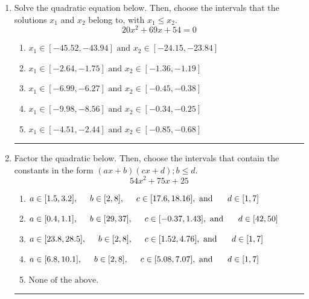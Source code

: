 \documentclass[14pt]{extbook}
\newcommand{\litem}[1]{\item#1\hspace*{-1cm}\rule{\textwidth}{0.4pt}}
\begin{document}
\begin{enumerate}
\litem{
Solve the quadratic equation below. Then, choose the intervals that the solutions $x_1$ and $x_2$ belong to, with $x_1 \leq x_2$.\[ 20x^{2} +69 x + 54 = 0 \]\begin{enumerate}[label=\Alph*.]
\item \( x_1 \in [-45.52, -43.94] \text{ and } x_2 \in [-24.15, -23.84] \)
\item \( x_1 \in [-2.64, -1.75] \text{ and } x_2 \in [-1.36, -1.19] \)
\item \( x_1 \in [-6.99, -6.27] \text{ and } x_2 \in [-0.45, -0.38] \)
\item \( x_1 \in [-9.98, -8.56] \text{ and } x_2 \in [-0.34, -0.25] \)
\item \( x_1 \in [-4.51, -2.44] \text{ and } x_2 \in [-0.85, -0.68] \)

\end{enumerate} }
\litem{
Factor the quadratic below. Then, choose the intervals that contain the constants in the form $(ax+b)(cx+d); b \leq d.$\[ 54x^{2} +75 x + 25 \]\begin{enumerate}[label=\Alph*.]
\item \( a \in [1.5, 3.2], \hspace*{5mm} b \in [2, 8], \hspace*{5mm} c \in [17.6, 18.16], \text{ and } \hspace*{5mm} d \in [1, 7] \)
\item \( a \in [0.4, 1.1], \hspace*{5mm} b \in [29, 37], \hspace*{5mm} c \in [-0.37, 1.43], \text{ and } \hspace*{5mm} d \in [42, 50] \)
\item \( a \in [23.8, 28.5], \hspace*{5mm} b \in [2, 8], \hspace*{5mm} c \in [1.52, 4.76], \text{ and } \hspace*{5mm} d \in [1, 7] \)
\item \( a \in [6.8, 10.1], \hspace*{5mm} b \in [2, 8], \hspace*{5mm} c \in [5.08, 7.07], \text{ and } \hspace*{5mm} d \in [1, 7] \)
\item \( \text{None of the above.} \)


\end{enumerate}}
\end{enumerate}
\end{document}
